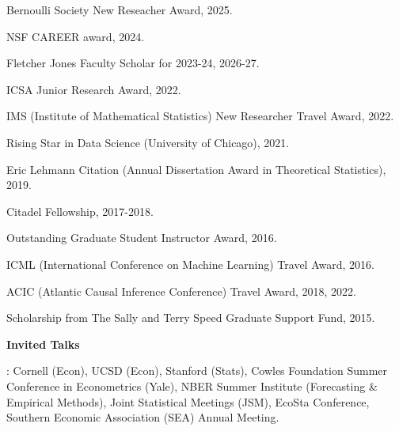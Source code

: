 \documentclass{article}
\begin{document}
Bernoulli Society New Reseacher Award, 2025.

\vspace{2mm}

NSF CAREER award, 2024.

\vspace{2mm}

Fletcher Jones Faculty Scholar for 2023-24, 2026-27. 

\vspace{2mm}

ICSA Junior Research Award, 2022.

\vspace{2mm}

IMS (Institute of Mathematical Statistics) New Researcher Travel Award, 2022.

\vspace{2mm}

Rising Star in Data Science (University of Chicago), 2021.

\vspace{2mm}

Eric Lehmann Citation (Annual Dissertation Award in Theoretical Statistics), 2019.

\vspace{2mm}

Citadel Fellowship, 2017-2018.

\vspace{2mm}

Outstanding Graduate Student Instructor Award, 2016.

\vspace{2mm}
ICML (International Conference on Machine Learning) Travel Award, 2016.

\vspace{2mm}
ACIC (Atlantic Causal Inference Conference) Travel Award, 2018, 2022.

\vspace{2mm}
Scholarship from The Sally and Terry Speed Graduate Support Fund, 2015.

\vspace{5mm}

\begin{large}
\noindent \textbf{Invited Talks}
\end{large}

\vspace{4mm}
: Cornell (Econ), UCSD (Econ), Stanford (Stats), Cowles Foundation Summer Conference in Econometrics (Yale), NBER Summer Institute (Forecasting \& Empirical Methods), Joint Statistical Meetings (JSM), EcoSta Conference, Southern Economic Association (SEA) Annual Meeting. 
\end{document}
